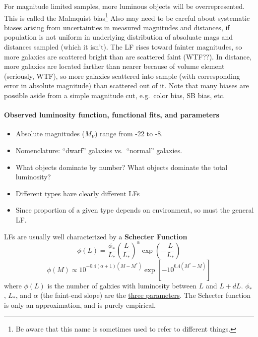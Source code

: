 \documentclass{article}
\newcommand{\mynotes}[1]{\textcolor{cadmiumgreen}{#1}}
\begin{document}
\mynotes{For magnitude limited samples, more luminous objects will be overrepresented.
This is called the Malmquist bias\footnote{Be aware that this name is sometimes
used to refer to different things.} Also may need to be careful about
systematic biases arising from uncertainties in measured magnitudes and
distances, if population is not uniform in underlying distribution of absoluate
mags and distances sampled (which it isn't). The LF rises toward fainter
magnitudes, so more galaxies are scattered bright than are scattered faint
(WTF??). In distance, more galaxies are located farther than nearer
because of volume element (seriously, WTF), so more galaxies
scattered into sample (with corresponding error in absolute magnitude) than
scattered out of it. Note that many biases are possible aside from a simple
magnitude cut, e.g.\ color bias, SB bias, etc.}

\paragraph{Observed luminosity function, functional fits, and parameters}
\begin{itemize}
    \item Absolute magnitudes ($M_{V}$) range from -22 to -8.
    \item Nomenclature: ``dwarf'' galaxies vs.\ ``normal'' galaxies.
    \item What objects dominate by number? What objects dominate the
        total luminosity?
    \item Different types have clearly different LFs
    \item Since proportion of a given type depends on environment, so
        must the general LF.
\end{itemize}

LFs are usually well characterized by a \textbf{Schecter Function}
\[
    \phi(L) = \frac{\phi_{*}}{L_{*}} \left( \frac{L}{L_{*}} \right) ^{\alpha}
    \exp\left( -\frac{L}{L_{*}} \right)
    \]
\[
    \phi(M) \propto 10^{ -0.4 \left( \alpha + 1 \right)
    \left( M - M^{*} \right) }
    \exp \left[ -10^{ 0.4(M^{*} - M) } \right]
    \]
where $\phi(L)$ is the number of galxies with luminosity between
$L$ and $L + dL$.  $\phi_{*}$, $L_{*}$, and $\alpha$ (the faint-end slope)
are the
\href{http://astronomy.nmsu.edu/holtz/a555/resources/schechter.gif}
{three parameters}. The Schecter function is only an approximation, and
is purely empirical.
\end{document}
